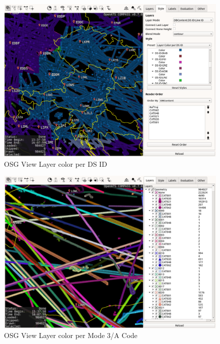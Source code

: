 \begin{figure}[H]
    \hspace*{-2.5cm}
    \includegraphics[width=19cm,frame]{figures/osgview_style_ds_id.png}
  \caption{OSG View Layer color per DS ID}
\end{figure}

\begin{figure}[H]
    \hspace*{-2.5cm}
    \includegraphics[width=19cm,frame]{figures/osgview_style_mode3a_code.png}
  \caption{OSG View Layer color per Mode 3/A Code}
\end{figure}

